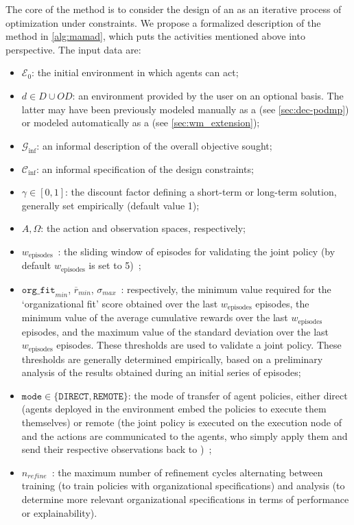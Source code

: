 The core of the  method is to consider the design of an  as an iterative process of optimization under constraints. We propose a formalized description of the  method in \autoref{alg:mamad}, which puts the activities mentioned above into perspective. The input data are:
\begin{itemize}
  \item $\mathcal{E}_0$: the initial environment in which agents can act;
  \item $d \in D \cup OD$: an environment provided by the user on an optional basis. The latter may have been previously modeled manually as a  (see \autoref{sec:dec-podmp}) or modeled automatically as a  (see \autoref{sec:wm_extension});
  \item $\mathcal{G}_{\text{inf}}$: an informal description of the overall objective sought;
  \item $\mathcal{C}_{\text{inf}}$: an informal specification of the design constraints;
  \item $\gamma \in [0,1]$: the discount factor defining a short-term or long-term solution, generally set empirically (default value 1);
  \item $A, \Omega$: the action and observation spaces, respectively;
  \item $w_{\text{episodes}} $~: the sliding window of episodes for validating the joint policy (by default $w_{\text{episodes}}$ is set to 5)~;
  \item $\texttt{org\_fit}_{min}$, $\overline{r}_{min}$, $\sigma_{max} $~: respectively, the minimum value required for the ‘organizational fit’ score obtained over the last $w_{\text{episodes}}$ episodes, the minimum value of the average cumulative rewards over the last $w_{\text{episodes}}$ episodes, and the maximum value of the standard deviation over the last $w_{\text{episodes}}$ episodes. These thresholds are used to validate a joint policy. These thresholds are generally determined empirically, based on a preliminary analysis of the results obtained during an initial series of episodes;
  \item $\texttt{mode} \in \{\texttt{DIRECT}, \texttt{REMOTE}\}$: the mode of transfer of agent policies, either direct (agents deployed in the environment embed the policies to execute them themselves) or remote (the joint policy is executed on the execution node of  and the actions are communicated to the agents, who simply apply them and send their respective observations back to )~;
  \item $n_{refine}$~: the maximum number of refinement cycles alternating between training (to train policies with organizational specifications) and analysis (to determine more relevant organizational specifications in terms of performance or explainability).
\end{itemize}

